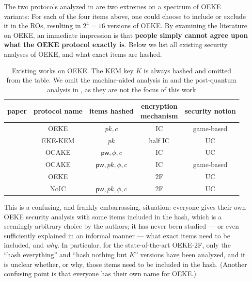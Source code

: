 \documentclass{article}
\theoremstyle{plain}
\theoremstyle{definition}
\theoremstyle{remark}
\newcommand{\pw}{\mathsf{pw}}
\begin{document}
The two protocols analyzed in \cite{EC:JanRoyXu25,EPRINT:ArrBarJar25} are two extremes on a spectrum of OEKE variants: For each of the four items above, one could choose to include or exclude it in the ROs, resulting in $2^4 = 16$ versions of OEKE. By examining the literature on OEKE, an immediate impression is that \textbf{people simply cannot agree upon what the OEKE protocol exactly is}. Below we list all existing security analyses of OEKE, and what exact items are hashed.
\begin{table}[H]\centering
\begin{tabular}{ |c|c|c|c|c| }
\hline
paper & protocol name & items hashed & \makecell{encryption \\ mechanism} & security notion \\
\hline
\cite{CCS:BreChePoi03} & OEKE & $pk,c$ & IC & game-based \\
\hline
\cite{EC:SanGuJar23} & EKE-KEM & $pk$ & half IC & UC \\
\hline
\cite{ACNS:BCPRR23} & OCAKE & $\pw,\phi,c$ & IC & UC \\
\hline
\cite{CANS:AHHRW24} & OCAKE & $\pw,pk,\phi,c$ & IC & game-based \\
\hline
\cite{EC:JanRoyXu25} & OEKE & & 2F & UC \\
\hline
\cite{EPRINT:ArrBarJar25} & NoIC & $\pw,pk,\phi,c$ & 2F & UC \\
\hline
\end{tabular}
\caption{Existing works on OEKE. The KEM key $K$ is always hashed and omitted from the table. We omit the machine-aided analysis in \cite{CSF:Blanchet12} and the post-quantum analysis in \cite{EPRINT:HHKR25}, as they are not the focus of this work}
\label{table:timeline}
\end{table}
This is a confusing, and frankly embarrassing, situation: everyone gives their own OEKE security analysis with some items included in the hash, which is a seemingly arbitrary choice by the authors; it has never been studied --- or even sufficiently explained in an informal manner --- what exact items need to be included, and \emph{why}. In particular, for the state-of-the-art OEKE-2F, only the ``hash everything'' and ``hash nothing but $K$'' versions have been analyzed, and it is unclear whether, or why, those items need to be included in the hash. (Another confusing point is that everyone has their own name for OEKE.)
\end{document}
